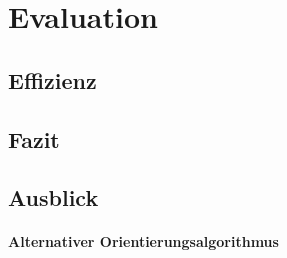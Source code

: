 \chapter{Evaluation}
\label{cha:evaluation}

\section{Effizienz}

\section{Fazit}

\section{Ausblick}

\subsubsection{Alternativer Orientierungsalgorithmus}
\label{sec:bug-0}

